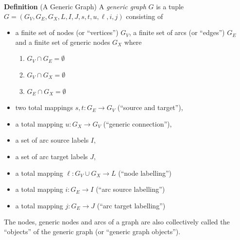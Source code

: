 \documentclass{cekarticle}
\begin{document}
\textbf{Definition} (A Generic Graph) A \emph{generic graph} $G$ is a tuple
$G = (G_{V}, G_{E}, G_{X}, L, I, J, s, t, u, \ell, i, j)$
consisting of
\begin{itemize}

\item a finite set of nodes (or ``vertices'') $G_{V}$, a finite set of arcs (or ``edges'') $G_{E}$
and a finite set of generic nodes $G_{X}$ where
    \begin{enumerate}
    \item $G_{V} \cap G_{E} = \emptyset$
    \item $G_{V} \cap G_{X} = \emptyset$
    \item $G_{E} \cap G_{X} = \emptyset$
    \end{enumerate}

\item two total mappings $s, t : G_{E} \rightarrow G_{V}$ (``source and target''),

\item a total mapping $u : G_{X} \rightarrow G_{V}$ (``generic connection''),

\item a set of arc source labels $I$,

\item a set of arc target labels $J$,

\item a total mapping $\ell : G_{V} \cup G_{X} \rightarrow L$ (``node labelling'')

\item a total mapping $i : G_{E} \rightarrow I$ (``arc source labelling'')

\item a total mapping $j : G_{E} \rightarrow J$ (``arc target labelling'')

\end{itemize}
The nodes, generic nodes and arcs of a graph are also collectively called the ``objects'' of the
generic graph (or ``generic graph objects'').
\end{document}

